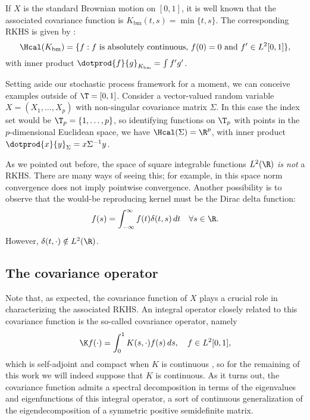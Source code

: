 \begin{example}\label{ex:bm}
  If \(X\) is the standard Brownian motion on \([0, 1]\), it is well known that the associated covariance function is \(K_{\text{bm}}(t, s) = \min\{t,s\}\). The corresponding RKHS is given by \citep[][Ex. 8.19]{janson1997gaussian}:
  \[
    \Hcal(K_{\text{bm}}) = \{f: f \text{ is absolutely continuous, } f(0)=0 \text{ and } f'\in L^2[0, 1]\},
  \]
  with inner product \(\dotprod{f}{g}_{K_{\text{bm}}} = \int f'g'\).
\end{example}

\begin{example}
  Setting aside our stochastic process framework for a moment, we can conceive examples outside of \(\T =[0,1]\). Consider a vector-valued random variable \(X = (X_1, \dots, X_p)\) with non-singular covariance matrix \(\Sigma\). In this case the index set would be \(\T_p = \{1,\dots,p\}\), so identifying functions on \(\T_p\) with points in the \(p\)-dimensional Euclidean space, we have \(\Hcal(\Sigma)=\R^p\), with inner product \(\dotprod{x}{y}_\Sigma=x\Sigma^{-1}y\).
\end{example}

\begin{example}
  As we pointed out before, the space of square integrable functions \(L^2(\R)\) \textit{is not} a RKHS. There are many ways of seeing this; for example, in this space norm convergence does not imply pointwise convergence. Another possibility is to observe that the would-be reproducing kernel must be the Dirac delta function:
  \[
    f(s) = \int_{-\infty}^\infty f(t)\delta(t, s)\, dt \quad \forall s \in \R.
  \]
  However, \(\delta(t, \cdot) \notin L^2(\R)\).
\end{example}

\subsection*{The covariance operator}

 Note that, as expected, the covariance function of \(X\) plays a crucial role in characterizing the associated RKHS. An integral operator closely related to this covariance function is the so-called covariance operator, namely
\[
\K f(\cdot) = \int_0^1 K(s, \cdot)f(s)\, ds, \quad f \in L^2[0, 1],
\]
which is self-adjoint and compact when \(K\) is continuous \citep[e.g.][Th.~4.6.2]{hsing2015theoretical}, so for the remaining of this work we will indeed suppose that \(K\) is continuous. As it turns out, the covariance function admits a spectral decomposition in terms of the eigenvalues and eigenfunctions of this integral operator, a sort of continuous generalization of the eigendecomposition of a symmetric positive semidefinite matrix.

